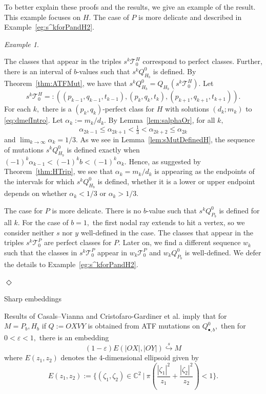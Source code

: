 \documentclass[11pt, reqno]{amsart}
\makeatletter
\def\subsection{\@startsection{subsection}{2}%
  \z@{.5\linespacing\@plus.7\linespacing}{-.5em}%
  {\normalfont\large\bfseries}}
\theoremstyle{remark}
\numberwithin{equation}{subsection}
\numberwithin{figure}{section}
\theoremstyle{customremark}
\newtheorem{example_no_diamond}[thm]{Example}
\newenvironment{example}{\begin{example_no_diamond} } {\hfill$\er$ \end{example_no_diamond}}
\newcommand{\Tt}{\mathcal{T}}
\newcommand{\al}{{\alpha}}
\newcommand{\er}{{\Diamond}}
\newcommand{\C}{\mathbb{C}}
\newcommand{\eps}{\varepsilon}
\newcommand{\sembeds}{\stackrel{s}{\hookrightarrow}}
\makeatother
\begin{document}
To better explain these proofs and the results, we give an example of the result. This example focuses on $H$. The case of $P$ is more delicate and described in Example~\ref{eg:s^kforPandH2}.
\begin{example} \label{eg:s^kforPandH}

    The classes that appear in the triples $s^k\Tt_0^H$ correspond to perfect classes. Further, there is an interval of $b$-values such that $s^kQ_{H_b}^0$ is defined. By Theorem~\ref{thm:ATFMut}, we have that $s^kQ_{H_b}^0=Q_{H_b}(s^k\Tt_0^H)$. Let 
     \[s^k\Tt_0^H=:\left((p_{k-1},q_{k-1},t_{k-1}),(p_{k},q_{k},t_{k}),(p_{k+1},q_{k+1},t_{k+1})\right).\]
     For each $k,$ there is a $(p_k,q_k)$-perfect class for $H$ with solutions $(d_k;m_k)$ to \eqref{eq:dmefIntro}. Let $\al_k:=m_k/d_k.$ By Lemma~\ref{lem:salphaOr}, for all $k,$
    \[ \al_{2k-1} \leq \al_{2k+1} < \tfrac{1}{3} < \al_{2k+2} \leq \al_{2k}\]
    and $\lim_{k \to \infty} \al_k=1/3.$
As we see in Lemma~\ref{lem:sMutDefinedH}, the sequence of mutations $s^kQ_{H_b}^0$ is defined exactly when $(-1)^{k}\al_{k-1}<(-1)^k b<(-1)^k\al_k.$ Hence, as suggested by Theorem~\ref{thm:HTrip}, we see that $\al_k=m_k/d_k$ is appearing as the endpoints of the intervals for which $s^kQ_{H_b}^0$ is defined, whether it is a lower or upper endpoint depends on whether $\al_k<1/3$ or $\al_k>1/3.$ 

The case for $P$ is more delicate. There is no $b$-value such that $s^kQ_{P_b}^0$ is defined for all $k.$ For the case of $b=1,$ the first nodal ray extends to hit a vertex, so we consider neither $s$ nor $y$ well-defined in the case. The classes that appear in the triples $s^k\Tt_0^P$ are perfect classes for $P.$ Later on, we find a different sequence $w_k$ such that the classes in $s^k\Tt_0^P$ appear in $w_k\Tt_0^P$ and $w_kQ_{P_b}^0$ is well-defined. We defer the details to Example~\ref{eg:s^kforPandH2}. 



\end{example}

\subsection{Sharp embeddings} \label{ss:introEmbed}

Results of Casals--Vianna \cite{CV} and Cristofaro-Gardiner et al. \cite{AADT} imply that for $M=P_b,H_b$ if $Q:=OXVY$ is obtained from ATF mutations on $Q_{\bullet,b}^0,$ then for $0<\eps<1,$ there is an embedding
\begin{equation} \label{eq:embedATF}
    (1-\eps)E(|OX|,|OY|) \sembeds M 
    \end{equation} 
where $E(z_1,z_2)$ denotes the $4$-dimensional ellipsoid given by \[E(z_1,z_2):=\{ (\zeta_1,\zeta_2) \in \C^2 \ | \ \pi\left(\frac{|\zeta_1|^2}{z_1}+\frac{|\zeta_2|^2}{z_2}\right)<1\}.\]
\end{document}
